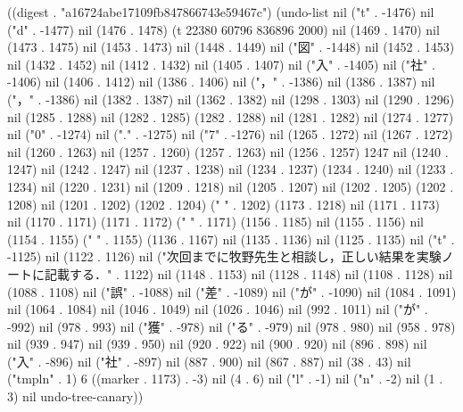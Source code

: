 
((digest . "a16724abe17109fb847866743e59467c") (undo-list nil ("t" . -1476) nil ("d" . -1477) nil (1476 . 1478) (t 22380 60796 836896 2000) nil (1469 . 1470) nil (1473 . 1475) nil (1453 . 1473) nil (1448 . 1449) nil ("図" . -1448) nil (1452 . 1453) nil (1432 . 1452) nil (1412 . 1432) nil (1405 . 1407) nil ("入" . -1405) nil ("社" . -1406) nil (1406 . 1412) nil (1386 . 1406) nil ("，" . -1386) nil (1386 . 1387) nil ("，" . -1386) nil (1382 . 1387) nil (1362 . 1382) nil (1298 . 1303) nil (1290 . 1296) nil (1285 . 1288) nil (1282 . 1285) (1282 . 1288) nil (1281 . 1282) nil (1274 . 1277) nil ("0" . -1274) nil ("." . -1275) nil ("7" . -1276) nil (1265 . 1272) nil (1267 . 1272) nil (1260 . 1263) nil (1257 . 1260) (1257 . 1263) nil (1256 . 1257) 1247 nil (1240 . 1247) nil (1242 . 1247) nil (1237 . 1238) nil (1234 . 1237) (1234 . 1240) nil (1233 . 1234) nil (1220 . 1231) nil (1209 . 1218) nil (1205 . 1207) nil (1202 . 1205) (1202 . 1208) nil (1201 . 1202) (1202 . 1204) ("   " . 1202) (1173 . 1218) nil (1171 . 1173) nil (1170 . 1171) (1171 . 1172) ("  " . 1171) (1156 . 1185) nil (1155 . 1156) nil (1154 . 1155) (" " . 1155) (1136 . 1167) nil (1135 . 1136) nil (1125 . 1135) nil ("t" . -1125) nil (1122 . 1126) nil ("次回までに牧野先生と相談し，正しい結果を実験ノートに記載する．" . 1122) nil (1148 . 1153) nil (1128 . 1148) nil (1108 . 1128) nil (1088 . 1108) nil ("誤" . -1088) nil ("差" . -1089) nil ("が" . -1090) nil (1084 . 1091) nil (1064 . 1084) nil (1046 . 1049) nil (1026 . 1046) nil (992 . 1011) nil ("が" . -992) nil (978 . 993) nil ("獲" . -978) nil ("る" . -979) nil (978 . 980) nil (958 . 978) nil (939 . 947) nil (939 . 950) nil (920 . 922) nil (900 . 920) nil (896 . 898) nil ("入" . -896) nil ("社" . -897) nil (887 . 900) nil (867 . 887) nil (38 . 43) nil ("tmpln" . 1) 6 ((marker . 1173) . -3) nil (4 . 6) nil ("l" . -1) nil ("n" . -2) nil (1 . 3) nil undo-tree-canary))
